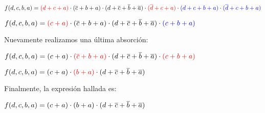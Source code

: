 $f(d,c,b,a)=\color{red}{(d+c+a)}\color{black}\cdot{(\overline{c}+b+a)}\cdot{(d+\overline{c}+\overline{b}+\overline{a})}\cdot\color{red}{(\overline{d}+c+a)}\color{black}\cdot\color{blue}{(d+c+b+a)}\color{black}\cdot\color{blue}{(\overline{d}+c+b+a)}$
\vspace{5mm}\par

$f(d,c,b,a)=\color{red}{(c+a)}\color{black}\cdot{(\overline{c}+b+a)}\cdot{(d+\overline{c}+\overline{b}+\overline{a})}\cdot\color{blue}{(c+b+a)}$
\vspace{5mm}\par

\noindent
\color{black}Nuevamente realizamos una \'ultima absorci\'on:\par\vspace{3mm}

$f(d,c,b,a)=\color{black}{(c+a)}\color{black}\cdot\color{red}{(\overline{c}+b+a)}\color{black}\cdot{(d+\overline{c}+\overline{b}+\overline{a})}\cdot\color{red}{(c+b+a)}$
\vspace{5mm}\par


$f(d,c,b,a)=\color{black}{(c+a)}\color{black}\cdot\color{red}{(b+a)}\color{black}\cdot{(d+\overline{c}+\overline{b}+\overline{a})}$
\vspace{5mm}\par


\noindent
\color{black}Finalmente, la expresi\'on hallada es:\par\vspace{3mm}

$f(d,c,b,a)=\color{black}{(c+a)}\cdot{(b+a)}\cdot{(d+\overline{c}+\overline{b}+\overline{a})}$
\vspace{5mm}\par